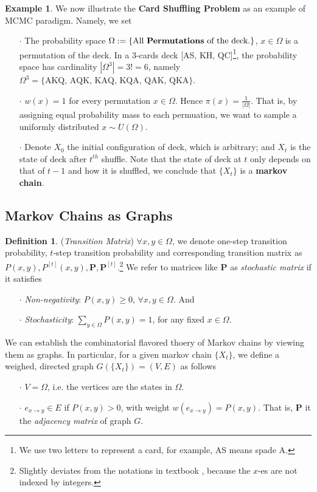 \documentclass[a4paper, 11pt]{article}
\theoremstyle{definition}
\newtheorem{definition}{Definition}
\newtheorem{example}{Example}
\begin{document}
\begin{example} We now illustrate the \textbf{Card Shuffling Problem} as an example of MCMC paradigm. Namely, we set
\begin{itemize}
	\item[$\cdot$] The probability space $\Omega:=\{ \text{All \textbf{Permutations} of the deck.}\}$, $x\in \Omega$ is a permutation of the deck. In a 3-cards deck [AS, KH, QC]\footnote{We use two letters to represent a card, for example, AS means spade A.}, the probability space has cardinality $|\Omega^3|=3!=6$, namely $\Omega^3=\{\text{AKQ, AQK, KAQ, KQA, QAK, QKA}\}$.
	\item[$\cdot$] $w(x)=1$ for every permutation $x\in\Omega$. Hence $\pi(x)=\frac{1}{|\Omega|}$. That is, by assigning equal probability mass to each permuation, we want to sample a uniformly distributed $x\sim U(\Omega)$.
	\item[$\cdot$] Denote $X_0$ the initial configuration of deck, which is arbitrary; and $X_t$ is the state of deck after $t^{th}$ shuffle. Note that the state of deck at $t$ only depends on that of $t-1$ and how it is shuffled, we conclude that $\{X_t\}$ is a \textbf{markov chain}.
\end{itemize}
\end{example}

\subsection{Markov Chains as Graphs}
\begin{definition} (\textit{Transition Matrix}) $\forall x, y\in \Omega$, we denote one-step transition probability, $t$-step transition probability and corresponding transition matrix as $P(x,y), P^{[t]}(x,y), \bm{P}, \bm{P}^{[t]}$.\footnote{Slightly deviates from the notations in textbook \cite{ross}, because the $x$-es are not indexed by integers.} We refer to matrices like $\bm{P}$ as \textit{stochastic matrix} if it satisfies
\begin{itemize}
	\item[$\cdot$] \textit{Non-negativity}: $P(x,y)\geq 0$, $\forall x,y\in\Omega$. And
	\item[$\cdot$] \textit{Stochasticity}: $\sum_{y\in \Omega}P(x,y)=1$, for any fixed $x\in \Omega$. 
\end{itemize}
\end{definition}
We can establish the combinatorial flavored thoery of Markov chains by viewing them as graphs. In particular, for a given markov chain $\{X_t\}$, we define a weighed, directed graph $G(\{X_t\})=(V,E)$ as follows
\begin{itemize}
	\item[$\cdot$] $V=\Omega$, i.e. the vertices are the states in $\Omega$.
	\item[$\cdot$] $e_{x\to y} \in E$ if $P(x,y)>0$, with weight $w(e_{x\to y})=P(x,y)$. That is, $\bm{P}$ it the \textit{adjacency matrix} of graph $G$.
\end{itemize}
\end{document}
